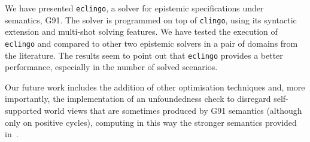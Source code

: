 \documentclass{new_tlp}
\def\eclingo{{\tt eclingo}}
\begin{document}
We have presented \eclingo{}, a solver for epistemic specifications under~\cite{gelfond91a} semantics, G91.
%
The solver is programmed on top of {\tt clingo}, using its syntactic extension and multi-shot solving features.
%
We have tested the execution of \eclingo{} and compared to other two epistemic solvers in a pair of domains from the literature.
%
The results seem to point out that \eclingo{} provides a better performance, especially in the number of solved scenarios.

Our future work includes the addition of other optimisation techniques and, more importantly, the implementation of an unfoundedness check to disregard self-supported world views that are sometimes produced by G91 semantics (although only on positive cycles), computing in this way the stronger semantics provided in~\cite{cafafa19b}.



\end{document}
